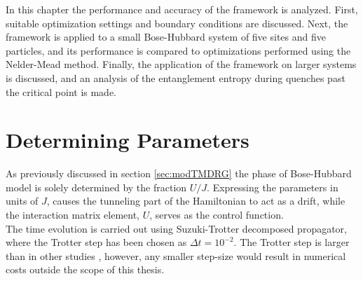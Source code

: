 In this chapter the performance and accuracy of the framework is analyzed. First, suitable optimization settings and boundary conditions are discussed.
Next, the framework is applied to a small Bose-Hubbard system of five sites and five particles, and its performance is compared to optimizations performed using the Nelder-Mead method.
Finally, the application of the framework on larger systems is discussed, and an analysis of the entanglement entropy during quenches past the critical point is made. 


\section{Determining Parameters}

As previously discussed in section \ref{sec:modTMDRG} the phase of Bose-Hubbard model is solely determined by the fraction $U/J$. Expressing the parameters in units of $J$, causes the tunneling part of the Hamiltonian to act as a drift, while the interaction matrix element, $U$, serves as the control function.\\
The time evolution is carried out using Suzuki-Trotter decomposed propagator, where the Trotter step has been chosen as $\Delta t = 10^{-2}$. The Trotter step is larger than in other studies \cite{Doria2011,FrankBloch,Braun2015}, however, any smaller step-size would result in numerical costs outside the scope of this thesis.


